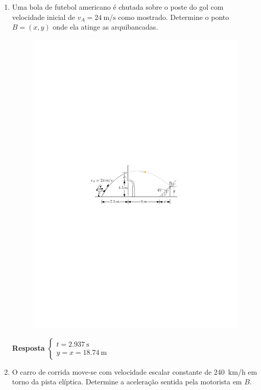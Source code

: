 \documentclass[a4paper,12pt]{article}
\begin{document}
\begin{enumerate}
		
		\vspace{2cm}
		\item Uma bola de futebol americano é chutada sobre o poste do gol com velocidade inicial de $v_{A}=\SI{24}{\meter/\second}$ como mostrado. Determine o ponto $B=(x,y)$ onde ela atinge as arquibancadas.
		
		\newpage
		
		\begin{figure}[h!]
			\centering
			\includegraphics[scale=1.2]{images/draw_10}
		\end{figure}
		
		\textbf{Resposta}
		$
		\begin{cases}
		t=\SI{2.937}{\second}\\
		y=x=\SI{18.74}{\meter}
		\end{cases}
		$
		
		\item O carro de corrida move-se com velocidade escalar constante de \SI{240}{\kilo\meter/\hour} em torno da pista elíptica. Determine a aceleração sentida pela motorista em $B$.
		

\end{enumerate}
\end{document}
